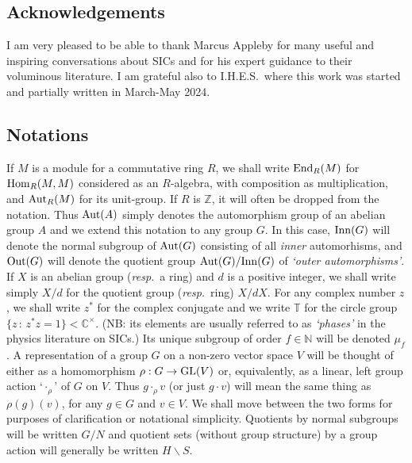 \documentclass[12pt]{article}
\newcommand{\Aut}{{\rm Aut}}
\newcommand{\bbC}{\ensuremath{\mathbb{C}}}\newcommand{\bbCp}{\ensuremath{\mathbb{C}_p}}
\newcommand{\bbN}{\ensuremath{\mathbb{N}}}
\newcommand{\bbT}{\ensuremath{\mathbb{T}}}
\newcommand{\bbZ}{\ensuremath{\mathbb{Z}}}
\newcommand{\End}{{\rm End}}
\newcommand{\GL}{{\rm GL}}
\newcommand{\Hom}{{\rm Hom}}
\newcommand{\Inn}{{\rm Inn}}
\newcommand{\Out}{{\rm Out}}
\newcommand{\resp}{{\em resp.}}
\begin{document}
\subsection{Acknowledgements}
I am very pleased to be able to thank Marcus Appleby for many useful and inspiring conversations about SICs and for his expert guidance to their voluminous literature. I am grateful  also to I.H.E.S.\ where this work was started and partially written in March-May 2024. 
\subsection{Notations}  
If $M$ is a module for a commutative ring $R$, we shall write 
$\End_R(M)$ for $\Hom_R(M,M)$ considered as an $R$-algebra, with composition as multiplication, and $\Aut_R(M)$ for its unit-group. If $R$ is $\bbZ$, it will often be dropped from the notation. Thus $\Aut(A)$ simply denotes the automorphism group of an abelian group $A$ and we extend this notation to any group $G$. In this case, $\Inn(G)$ will denote the normal subgroup of $\Aut(G)$ consisting of all \textit{inner} automorhisms, and $\Out(G)$ will denote the quotient group $\Aut(G)/\Inn(G)$ of \textit{`outer automorphisms'}. If $X$ is an abelian group (\resp\ a ring) and $d$ is a positive integer, we shall write simply $X/d$ for the quotient group (\resp\ ring) $X/dX$. For any complex number $z$, we shall write $z^\ast$ for the complex conjugate and we write $\bbT$ for the circle group 
$\{z\,:\,z^\ast z=1\}<\bbC^\times $. (NB: its elements are usually referred to as \textit{`phases'} in the physics literature on SICs.) Its unique subgroup of order $f\in\bbN$ will be denoted $\mu_f$. 
A representation of a group $G$ on a non-zero vector space $V$ will be thought of either as a homomorphism $\rho:G\rightarrow\GL(V)$ or, equivalently, as a linear, left group action `$\cdot_\rho$' of $G$ on $V$. Thus $g\cdot_\rho v$ (or just $g\cdot v$) will mean the same thing as $\rho(g)(v)$, for any $g\in G$ and $v\in V$. We shall move between the two forms for purposes of  clarification or notational simplicity. Quotients by normal subgroups will be written $G/N$ and quotient sets (without group structure) by a group action will generally be written $H\backslash S$. 

\end{document}
